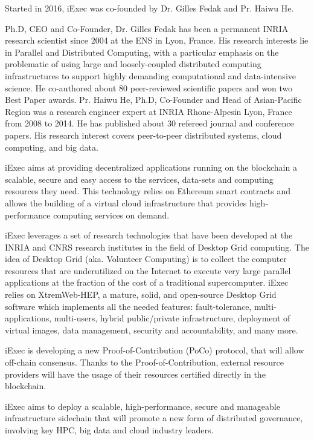   Started in 2016, iExec was co-founded by Dr. Gilles Fedak and Pr. Haiwu He.

  Ph.D, CEO and Co-Founder, Dr. Gilles Fedak has been a permanent INRIA research scientist since
  2004 at the ENS in Lyon, France. His research interests lie in Parallel and Distributed
  Computing, with a particular emphasis on the problematic of using large and loosely-coupled
  distributed computing infrastructures to support highly demanding computational and
  data-intensive science. He co-authored about 80 peer-reviewed scientific papers and won two
  Best Paper awards. Pr. Haiwu He, Ph.D, Co-Founder and Head of Asian-Pacific Region was a
  research engineer expert at INRIA Rhone-Alpesin Lyon, France from 2008 to 2014. He has
  published about 30 refereed journal and conference papers. His research interest covers
  peer-to-peer distributed systems, cloud computing, and big data.

  iExec aims at providing decentralized applications running on the blockchain a scalable,
  secure and easy access to the services, data-sets and computing resources they need. This
  technology relies on Ethereum smart contracts and allows the building of a virtual cloud
  infrastructure that provides high-performance computing services on demand.

  iExec leverages a set of research technologies that have been developed at the INRIA and CNRS
  research institutes in the field of Desktop Grid computing. The idea of Desktop Grid
  (aka. Volunteer Computing) is to collect the computer resources that are underutilized on the
  Internet to execute very large parallel applications at the fraction of the cost of a
  traditional supercomputer. iExec relies on XtremWeb-HEP, a mature, solid, and open-source Desktop
  Grid software which implements all the needed features: fault-tolerance, multi-applications,
  multi-users, hybrid public/private infrastructure, deployment of virtual images, data management,
  security and accountability, and many more.

  iExec is developing a new Proof-of-Contribution (PoCo) protocol, that will allow off-chain
  consensus. Thanks to the Proof-of-Contribution, external resource providers will have the usage
  of their resources certified directly in the blockchain.

  iExec aims to deploy a scalable, high-performance, secure and manageable infrastructure sidechain
  that will promote a new form of distributed governance, involving key HPC, big data and cloud
  industry leaders.

